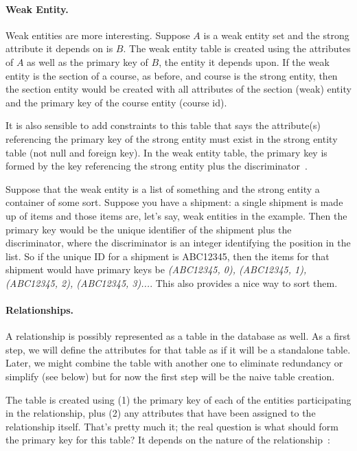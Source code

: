 \documentclass[a4paper]{report}
\begin{document}
\paragraph{Weak Entity.} Weak entities are more interesting. Suppose $A$ is a weak entity set and the strong attribute it depends on is $B$. The weak entity table is created using the attributes of $A$ as well as the primary key of $B$, the entity it depends upon. If the weak entity is the section of a course, as before, and course is the strong entity, then the section entity would be created with all attributes of the section (weak) entity and the primary key  of the course entity (course id).

It is also sensible to add constraints to this table that says the attribute(s) referencing the primary key of the strong entity  must exist in the strong entity table (not null and foreign key). In the weak entity table, the primary key is formed by the key referencing the strong entity plus the discriminator~\cite{dsc}.

Suppose that the weak entity is a list of something and the strong entity a container of some sort. Suppose you have a shipment: a single shipment is made up of items and those items are, let's say, weak entities in the example. Then the primary key would be the unique identifier of the shipment plus the discriminator, where the discriminator is an integer identifying the position in the list. So if the unique ID for a shipment is ABC12345, then the items for that shipment would have primary keys be \textit{(ABC12345, 0), (ABC12345, 1), (ABC12345, 2), (ABC12345, 3)...}. This also provides a nice way to sort them.

\paragraph{Relationships.} 
A relationship is possibly represented as a table in the database as well. As a first step, we will define the attributes for that table as if it will be a standalone table. Later, we might combine the table with another one to eliminate redundancy or simplify (see below) but for now the first step will be the naive table creation.

The table is created using (1) the primary key of each of the entities participating in the relationship, plus (2) any attributes that have been assigned to the relationship itself. That's pretty much it; the real question is what should form the primary key for this table? It depends on the nature of the relationship~\cite{dsc}:
\end{document}
